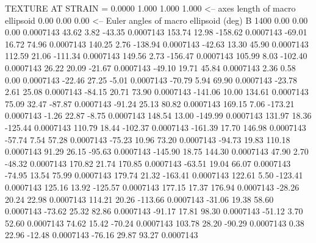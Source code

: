 TEXTURE AT STRAIN =    0.0000
   1.000   1.000   1.000  <-- axes length of macro ellipsoid
    0.00    0.00    0.00  <-- Euler angles of macro ellipsoid (deg)
B      1400
        0.00        0.00        0.00     0.0007143
       43.62        3.82      -43.35     0.0007143
      153.74       12.98     -158.62     0.0007143
      -69.01       16.72       74.96     0.0007143
      140.25        2.76     -138.94     0.0007143
      -42.63       13.30       45.90     0.0007143
      112.59       21.06     -111.34     0.0007143
      149.56        2.73     -156.47     0.0007143
      105.99        8.03     -102.40     0.0007143
       26.22       20.09      -21.67     0.0007143
      -49.10       19.71       45.84     0.0007143
        2.36        0.58        0.00     0.0007143
      -22.46       27.25       -5.01     0.0007143
      -70.79        5.94       69.90     0.0007143
      -23.78        2.61       25.08     0.0007143
      -84.15       20.71       73.90     0.0007143
     -141.06       10.00      134.61     0.0007143
       75.09       32.47      -87.87     0.0007143
      -91.24       25.13       80.82     0.0007143
      169.15        7.06     -173.21     0.0007143
       -1.26       22.87       -8.75     0.0007143
      148.54       13.00     -149.99     0.0007143
      131.97       18.36     -125.44     0.0007143
      110.79       18.44     -102.37     0.0007143
     -161.39       17.70      146.98     0.0007143
      -57.74        7.54       57.28     0.0007143
      -75.23       10.96       73.20     0.0007143
      -94.73       19.83      110.18     0.0007143
       91.29       26.15      -95.63     0.0007143
     -145.90       18.75      144.30     0.0007143
       47.90        2.70      -48.32     0.0007143
      170.82       21.74      170.85     0.0007143
      -63.51       19.04       66.07     0.0007143
      -74.95       13.54       75.99     0.0007143
      179.74       21.32     -163.41     0.0007143
      122.61        5.50     -123.41     0.0007143
      125.16       13.92     -125.57     0.0007143
      177.15       17.37      176.94     0.0007143
      -28.26       20.24       22.98     0.0007143
      114.21       20.26     -113.66     0.0007143
      -31.06       19.38       58.60     0.0007143
      -73.62       25.32       82.86     0.0007143
      -91.17       17.81       98.30     0.0007143
      -51.12        3.70       52.60     0.0007143
       74.62       15.42      -70.24     0.0007143
      103.78       28.20      -90.29     0.0007143
        0.38       22.96      -12.48     0.0007143
      -76.16       29.87       93.27     0.0007143
